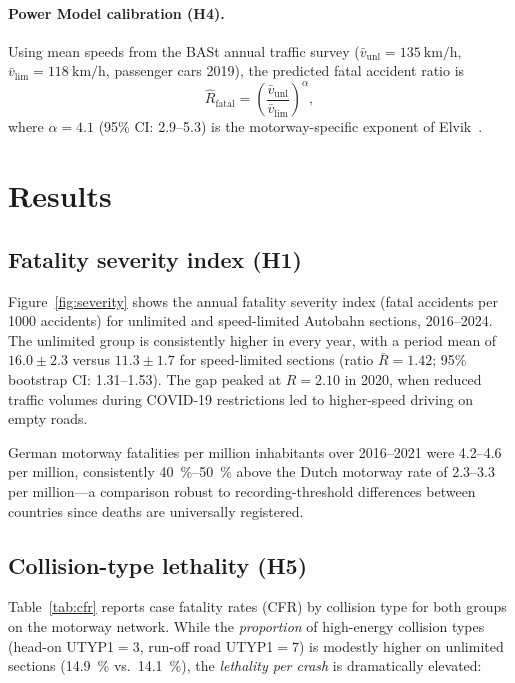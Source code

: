 \documentclass[aps,prl,twocolumn,superscriptaddress,longbibliography]{revtex4-2}
\begin{document}
\paragraph{Power Model calibration (H4).}
Using mean speeds from the BASt annual traffic survey
($\bar{v}_\mathrm{unl} = \SI{135}{\kilo\metre\per\hour}$,
$\bar{v}_\mathrm{lim} = \SI{118}{\kilo\metre\per\hour}$, passenger cars 2019),
the predicted fatal accident ratio is
\begin{equation}
  \hat{R}_\mathrm{fatal} = \left(\frac{\bar{v}_\mathrm{unl}}{\bar{v}_\mathrm{lim}}\right)^{\!\alpha},
  \label{eq:power}
\end{equation}
where $\alpha = 4.1$ (95\% CI: 2.9--5.3) is the motorway-specific exponent of
Elvik~\cite{Elvik2013}.

\section{Results}

\subsection{Fatality severity index (H1)}

Figure~\ref{fig:severity} shows the annual fatality severity index
(fatal accidents per \num{1000} accidents) for unlimited and speed-limited Autobahn
sections, 2016--2024.
The unlimited group is consistently higher in every year, with a period mean of
$16.0 \pm 2.3$ versus $11.3 \pm 1.7$ for speed-limited sections
(ratio $\bar{R} = 1.42$; 95\% bootstrap CI: 1.31--1.53).
The gap peaked at $R = 2.10$ in 2020, when reduced traffic volumes during
COVID-19 restrictions led to higher-speed driving on empty roads.

German motorway fatalities per million inhabitants over 2016--2021 were
4.2--4.6 per million, consistently \SI{40}{\percent}--\SI{50}{\percent} above
the Dutch motorway rate of 2.3--3.3 per million---a comparison robust to
recording-threshold differences between countries since deaths are universally
registered.

\subsection{Collision-type lethality (H5)}

Table~\ref{tab:cfr} reports case fatality rates (CFR) by collision type for both
groups on the motorway network.
While the \emph{proportion} of high-energy collision types (head-on UTYP1$=3$,
run-off road UTYP1$=7$) is modestly higher on unlimited sections
(\SI{14.9}{\percent} vs.\ \SI{14.1}{\percent}), the \emph{lethality per crash} is
dramatically elevated:
\end{document}
